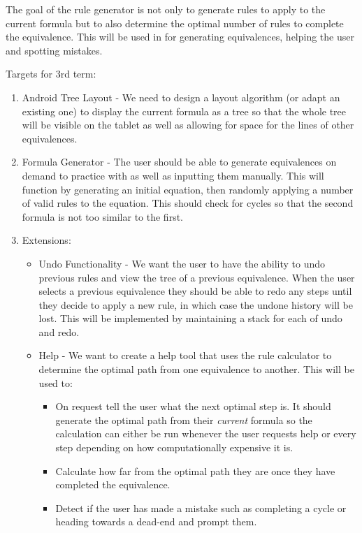 \documentclass{report}
\begin{document}
The goal of the rule generator is not only to generate rules to apply to the current formula but to also determine the optimal number of rules to complete the equivalence. This will be used in for generating equivalences, helping the user and spotting mistakes.

Targets for 3rd term:

\begin{enumerate}
\item Android Tree Layout - We need to design a layout algorithm (or adapt an existing one) to display the current formula as a tree so that the whole tree will be visible on the tablet as well as allowing for space for the lines of other equivalences.
\item Formula Generator - The user should be able to generate equivalences on demand to practice with as well as inputting them manually. This will function by generating an initial equation, then randomly applying a number of valid rules to the equation. This should check for cycles so that the second formula is not too similar to the first.
\item Extensions:

\begin{itemize}
\item Undo Functionality - We want the user to have the ability to undo previous rules and view the tree of a previous equivalence. When the user selects a previous equivalence they should be able to redo any steps until they decide to apply a new rule, in which case the undone history will be lost. This will be implemented by maintaining a stack for each of undo and redo.
\item Help - We want to create a help tool that uses the rule calculator to determine the optimal path from one equivalence to another. This will be used to:

\begin{itemize}
\item On request tell the user what the next optimal step is. It should generate the optimal path from their \textit{current} formula so the calculation can either be run whenever the user requests help or every step depending on how computationally expensive it is.
\item Calculate how far from the optimal path they are once they have completed the equivalence.
\item Detect if the user has made a mistake such as completing a cycle or heading towards a dead-end and prompt them.
\end{itemize}
  

\end{itemize}
\end{enumerate}
\end{document}
